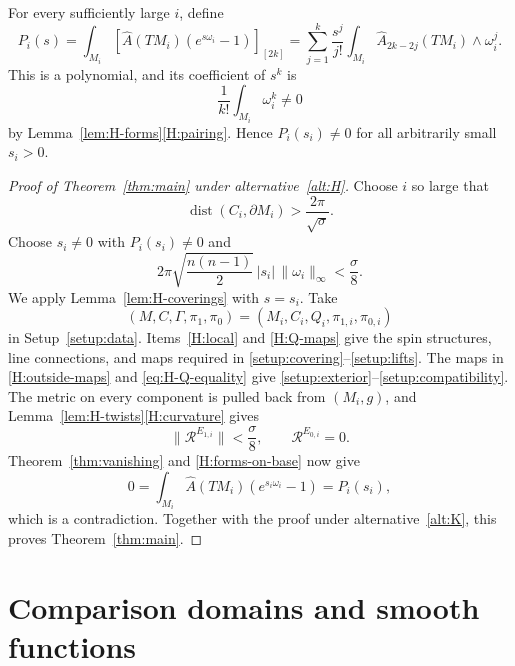 \documentclass[12pt,reqno]{amsart}
\numberwithin{equation}{section}
\theoremstyle{definition}
\newcommand{\Ahat}{\widehat A}
\newcommand{\dist}{\operatorname{dist}}
\newcommand{\cR}{\mathcal R}
\begin{document}
\vspace{0.5cm}

For every sufficiently large $i$, define
\[
 P_i(s)=\int_{M_i}
 [\Ahat(TM_i)(e^{s\omega_i}-1)]_{[2k]}
 =\sum_{j=1}^k\frac{s^j}{j!}
   \int_{M_i}\Ahat_{2k-2j}(TM_i)\wedge\omega_i^j.
\]
This is a polynomial, and its coefficient of $s^k$ is
\[
 \frac1{k!}\int_{M_i}\omega_i^k\ne0
\]
by Lemma~\ref{lem:H-forms}\ref{H:pairing}.  Hence $P_i(s_i)\ne0$ for all arbitrarily small $s_i>0$.

\begin{proof}[Proof of Theorem~\ref{thm:main} under
alternative~\ref{alt:H}]
Choose $i$ so large that
\[
 \dist(C_i,\partial M_i)>\frac{2\pi}{\sqrt\sigma}.
\]
Choose $s_i\ne0$ with $P_i(s_i)\ne0$ and
\[
 2\pi\sqrt{\frac{n(n-1)}2}\,
 |s_i|\,\|\omega_i\|_\infty<\frac\sigma8.
\]
We apply Lemma~\ref{lem:H-coverings} with $s=s_i$.  Take
\[
 (M,C,\Gamma,\pi_1,\pi_0)
 =(M_i,C_i,Q_i,\pi_{1,i},\pi_{0,i})
\]
in Setup~\ref{setup:data}.  Items~\ref{H:local} and \ref{H:Q-maps}
give the spin structures, line connections, and maps required in
\ref{setup:covering}--\ref{setup:lifts}. The maps in
\ref{H:outside-maps} and \eqref{eq:H-Q-equality} give
\ref{setup:exterior}--\ref{setup:compatibility}.  The metric on every
component is pulled back from $(M_i,g)$, and
Lemma~\ref{lem:H-twists}\ref{H:curvature} gives
\[
 \|\cR^{E_{1,i}}\|<\frac\sigma8,
 \qquad \cR^{E_{0,i}}=0.
\]
Theorem~\ref{thm:vanishing} and \ref{H:forms-on-base} now give
\[
 0=\int_{M_i}\Ahat(TM_i)(e^{s_i\omega_i}-1)=P_i(s_i),
\]
which is a contradiction.  Together with the proof under
alternative~\ref{alt:K}, this proves Theorem~\ref{thm:main}.
\end{proof}




\vspace{0.5cm}

\appendix

\section{Comparison domains and smooth functions}
\label{app:localization}
\end{document}
